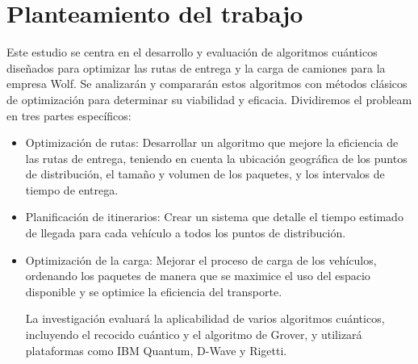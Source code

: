 



\section{Planteamiento del trabajo}

    Este estudio se centra en el desarrollo y evaluación de algoritmos cuánticos diseñados para optimizar las rutas de entrega y la carga de camiones para la empresa Wolf. Se analizarán y compararán estos algoritmos con métodos clásicos de optimización para determinar su viabilidad y eficacia. Dividiremos el probleam en tres partes específicos:

    \begin{itemize}
    \item Optimización de rutas: Desarrollar un algoritmo que mejore la eficiencia de las rutas de entrega, teniendo en cuenta la ubicación geográfica de los puntos de distribución, el tamaño y volumen de los paquetes, y los intervalos de tiempo de entrega.
    
    \item Planificación de itinerarios: Crear un sistema que detalle el tiempo estimado de llegada para cada vehículo a todos los puntos de distribución.
    
    \item Optimización de la carga: Mejorar el proceso de carga de los vehículos, ordenando los paquetes de manera que se maximice el uso del espacio disponible y se optimice la eficiencia del transporte.
    
    La investigación evaluará la aplicabilidad de varios algoritmos cuánticos, incluyendo el recocido cuántico y el algoritmo de Grover, y utilizará plataformas como IBM Quantum, D-Wave y Rigetti.
    \end{itemize}

